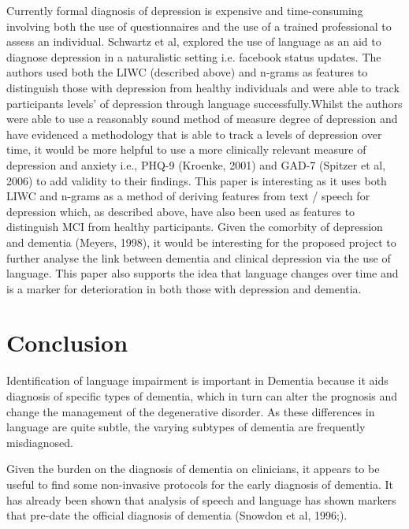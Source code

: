 \documentclass[a4paper]{article}
\begin{document}
\newline
\par
Currently formal diagnosis of depression is expensive and time-consuming involving both the use of questionnaires and the use of a trained professional to assess an individual. Schwartz et al, explored the use of language as an aid to diagnose depression in a naturalistic setting i.e. facebook status updates. The authors used both the LIWC (described above) and n-grams as features to distinguish those with depression from healthy individuals and were able to track participants levels' of depression through language successfully.Whilst the authors were able to use a reasonably sound method of measure degree of depression and have evidenced a methodology that is able to track a levels of depression over time, it would be more helpful to use a more clinically relevant measure of depression and anxiety i.e., PHQ-9 (Kroenke, 2001) and GAD-7 (Spitzer et al, 2006) to add validity to their findings. 
This paper is interesting as it uses both LIWC and n-grams as a method of deriving features from text / speech for depression which, as described above, have also been used as features to distinguish MCI from healthy participants. Given the comorbity of depression and dementia (Meyers, 1998), it would be interesting for the proposed project to further analyse the link between dementia and clinical depression via the use of language. This paper also supports the idea that language changes over time and is a marker for deterioration in both those with depression and dementia.


\section{Conclusion}
\par
Identification of language impairment is important in Dementia because it aids diagnosis of specific types of dementia, which in turn can alter the prognosis and change the management of the degenerative disorder. As these differences in language are quite subtle, the varying subtypes of dementia are frequently misdiagnosed.
\newline
\par 
Given the burden on the diagnosis of dementia on clinicians, it appears to be useful to find some non-invasive protocols for the early diagnosis of dementia. It has already been shown that analysis of speech and language has shown markers that pre-date the official diagnosis of dementia (Snowdon et al, 1996;)\cite{Berisha2015}.



\end{document}
